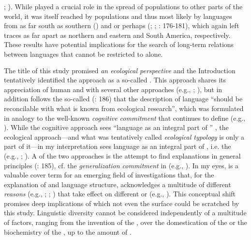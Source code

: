 \citealt{HaakLazaridis2015}; \citealt{JonesGonzales-Fortes2015}). While  played a crucial role in the spread of populations to other parts of the world, it was itself reached by populations and thus most likely by languages from as far south as southern  (\citealt{HongQi2013}) and  or perhaps  (\citealt{RaghavanSteinrücken2015}; \citealt{SkoglundMallick2015}; \citealt{Reich2018}: 176-181), which again left traces as far apart as northern and eastern  and South America, respectively. These results have potential implications for the search of long-term relations between languages that cannot be restricted to  alone.

The title of this study promised \textit{an ecological perspective} and the Introduction tentatively identified the approach as a so-called \textit{}. This approach shares its appreciation of human and  with several other approaches (e.g., \citealt{EvansLevinson2009}; \citealt{Levinson2012a}), but in addition follows the so-called \textit{} (\citealt{Hölzl2015e}: 186) that the description of language “should be reconcilable with what is known from ecological research”, which was formulated in analogy to the well-known \textit{cognitive commitment} that continues to define  (e.g., \citealt{Evans2012}). While the cognitive approach sees “language as an integral part of ” \citep[539]{Langacker2008}, the ecological approach---and what was tentatively called \textit{ecological typology} is only a part of it---in my interpretation sees language as an integral part of , i.e. the \textit{} (e.g., \citealt{Järvilehto1998}; \citealt{Odling-SmeeLaland2009}). A  of the two approaches is the attempt to find explanations in general principles (\citealt{Hölzl2015d}: 185), cf. the \textit{generalization commitment} in  (e.g., \citealt{Evans2012}). In my eyes, \textit{} is a valuable cover term for an emerging field of investigations that, for the explanation of  and language structure, acknowledges a multitude of different \textit{reasons} (e.g., \citealt{SteffensenFill2014}; \citealt{Bickel2015}; \citealt{DeBusser2015}) that take effect on different \textit{} or \textit{} (e.g., \citealt{Enfield2014}). This conceptual shift promises deep implications of which not even the surface could be scratched by this study. Linguistic diversity cannot be considered independently of a multitude of factors, ranging from the invention of the , over the domestication of the  or the biochemistry of the , up to the amount of .

